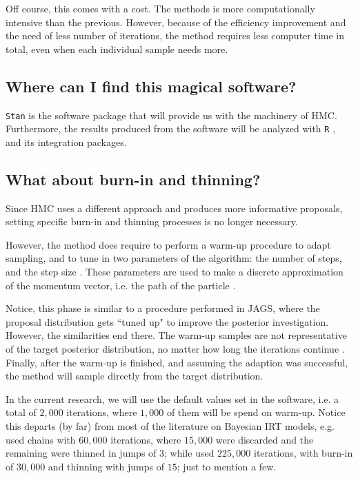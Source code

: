 Off course, this comes with a cost. The methods is more computationally intensive than the previous. However, because of the efficiency improvement and the need of less number of iterations, the method requires less computer time in total, even when each individual sample needs more.


\subsection{Where can I find this magical software?}

\texttt{Stan} \cite{Stan2020} is the software package that will provide us with the machinery of HMC. Furthermore, the results produced from the software will be analyzed with \texttt{R} \cite{R2015, RStan2020}, and its integration packages. 


\subsection{What about burn-in and thinning?}

Since HMC uses a different approach and produces more informative proposals, setting specific burn-in and thinning processes is no longer necessary.

However, the method does require to perform a warm-up procedure to adapt sampling, and to tune in two parameters of the algorithm: the number of steps, and the step size \cite{Stan2020}. These parameters are used to make a discrete approximation of the momentum vector, i.e. the path of the particle \cite{Neal_2011, Betancourt_et_al_2013}. 

Notice, this phase is similar to a procedure performed in JAGS, where the proposal distribution gets ``tuned up" to improve the posterior investigation. However, the similarities end there. The warm-up samples are not representative of the target posterior distribution, no matter how long the iterations continue \cite{McElreath_2020}. Finally, after the warm-up is finished, and assuming the adaption was successful, the method will sample directly from the target distribution.

In the current research, we will use the default values set in the software, i.e. a total of $2,000$ iterations, where $1,000$ of them will be spend on warm-up. Notice this departs (by far) from most of the literature on Bayesian IRT models, e.g. \citet{Fujimoto_2018a} used chains with $60,000$ iterations, where $15,000$ were discarded and the remaining were thinned in jumps of $3$; while \citet{Fujimoto_2018b} used $225,000$ iterations, with burn-in of $30,000$ and thinning with jumps of $15$; just to mention a few.


